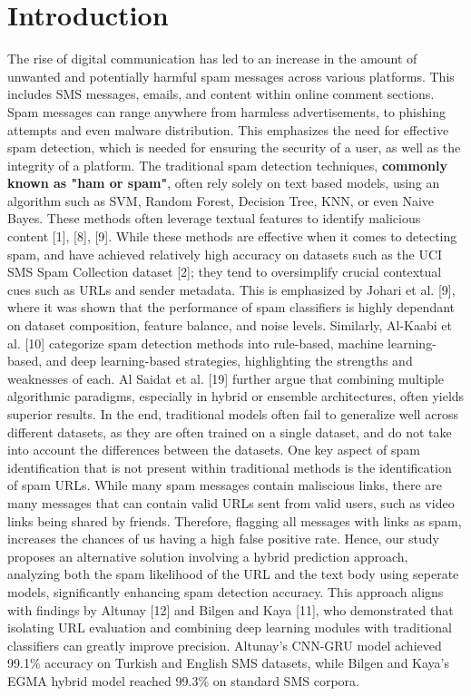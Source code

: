 \documentclass{article}
\begin{document}
\section{Introduction}
The rise of digital communication has led to an increase in the amount of unwanted and potentially harmful spam messages across various platforms. This includes SMS messages, emails, and content within online comment sections. Spam messages can range anywhere from harmless advertisements, to phishing attempts and even malware distribution. This emphasizes the need for effective spam detection, which is needed for ensuring the security of a user, as well as the integrity of a platform. The traditional spam detection techniques, \textbf{commonly known as "ham or spam"}, often rely solely on text based models, using an algorithm such as SVM, Random Forest, Decision Tree, KNN, or even Naive Bayes. These methods often leverage textual features to identify malicious content [1], [8], [9]. 
\newline
\newline
While these methods are effective when it comes to detecting spam, and have achieved relatively high accuracy on datasets such as the UCI SMS Spam Collection dataset [2]; they tend to oversimplify crucial contextual cues such as URLs and sender metadata. This is emphasized by Johari et al. [9], where it was shown that the performance of spam classifiers is highly dependant on dataset composition, feature balance, and noise levels. Similarly, Al-Kaabi et al. [10] categorize spam detection methods into rule-based, machine learning-based, and deep learning-based strategies, highlighting the strengths and weaknesses of each. Al Saidat et al. [19] further argue that combining multiple algorithmic paradigms, especially in hybrid or ensemble architectures, often yields superior results. In the end, traditional models often fail to generalize well across different datasets, as they are often trained on a single dataset, and do not take into account the differences between the datasets.
\newline
\newline
One key aspect of spam identification that is not present within traditional methods is the identification of spam URLs. While many spam messages contain maliscious links, there are many messages that can contain valid URLs sent from valid users, such as video links being shared by friends. Therefore, flagging all messages with links as spam, increases the chances of us having a high false positive rate. Hence, our study proposes an alternative solution involving a hybrid prediction approach, analyzing both the spam likelihood of the URL and the text body using seperate models, significantly enhancing spam detection accuracy. This approach aligns with findings by Altunay [12] and Bilgen and Kaya [11], who demonstrated that isolating URL evaluation and combining deep learning modules with traditional classifiers can greatly improve precision. Altunay’s CNN-GRU model achieved 99.1\% accuracy on Turkish and English SMS datasets, while Bilgen and Kaya’s EGMA hybrid model reached 99.3\% on standard SMS corpora.
\end{document}
